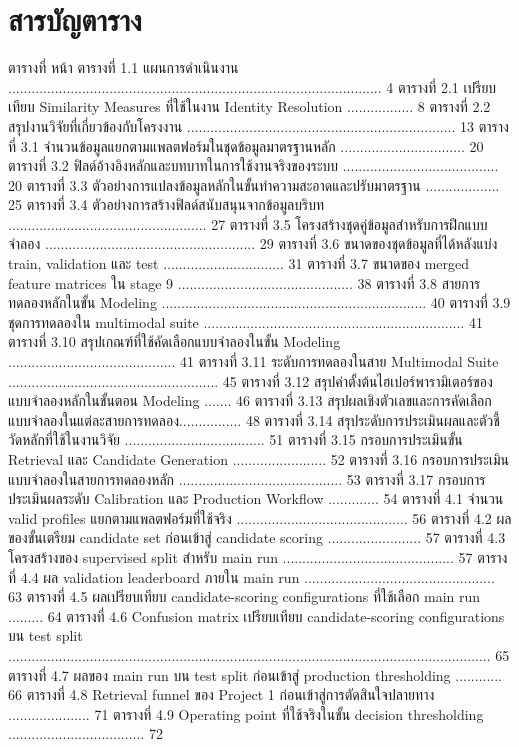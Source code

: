 \documentclass[12pt,a4paper]{report}
\begin{document}
\section*{สารบัญตาราง}
ตารางที่ หน้า ตารางที่ 1.1 แผนการดำเนินงาน ................................................................................................ 4 ตารางที่ 2.1 เปรียบเทียบ Similarity Measures ที่ใช้ในงาน Identity Resolution ................. 8 ตารางที่ 2.2 สรุปงานวิจัยที่เกี่ยวข้องกับโครงงาน ..................................................................... 13 ตารางที่ 3.1 จำนวนข้อมูลแยกตามแพลตฟอร์มในชุดข้อมูลมาตรฐานหลัก ................................ 20 ตารางที่ 3.2 ฟิลด์อ้างอิงหลักและบทบาทในการใช้งานจริงของระบบ ........................................ 20 ตารางที่ 3.3 ตัวอย่างการแปลงข้อมูลหลักในขั้นทำความสะอาดและปรับมาตรฐาน ................... 25 ตารางที่ 3.4 ตัวอย่างการสร้างฟิลด์สนับสนุนจากข้อมูลบริบท ................................................... 27 ตารางที่ 3.5 โครงสร้างชุดคู่ข้อมูลสำหรับการฝึกแบบจำลอง ...................................................... 29 ตารางที่ 3.6 ขนาดของชุดข้อมูลที่ได้หลังแบ่ง train, validation และ test ............................... 31 ตารางที่ 3.7 ขนาดของ merged feature matrices ใน stage 9 ............................................. 38 ตารางที่ 3.8 สายการทดลองหลักในขั้น Modeling .................................................................... 40 ตารางที่ 3.9 ชุดการทดลองใน multimodal suite ................................................................... 41 ตารางที่ 3.10 สรุปเกณฑ์ที่ใช้คัดเลือกแบบจำลองในขั้น Modeling ........................................... 41 ตารางที่ 3.11 ระดับการทดลองในสาย Multimodal Suite ...................................................... 45 ตารางที่ 3.12 สรุปค่าตั้งต้นไฮเปอร์พารามิเตอร์ของแบบจำลองหลักในขั้นตอน Modeling ....... 46 ตารางที่ 3.13 สรุปผลเชิงตัวเลขและการคัดเลือกแบบจำลองในแต่ละสายการทดลอง................ 48 ตารางที่ 3.14 สรุประดับการประเมินผลและตัวชี้วัดหลักที่ใช้ในงานวิจัย .................................... 51 ตารางที่ 3.15 กรอบการประเมินขั้น Retrieval และ Candidate Generation ........................ 52 ตารางที่ 3.16 กรอบการประเมินแบบจำลองในสายการทดลองหลัก .......................................... 53 ตารางที่ 3.17 กรอบการประเมินผลระดับ Calibration และ Production Workflow ............. 54 ตารางที่ 4.1 จำนวน valid profiles แยกตามแพลตฟอร์มที่ใช้จริง ............................................ 56 ตารางที่ 4.2 ผลของขั้นเตรียม candidate set ก่อนเข้าสู่ candidate scoring ........................ 57 ตารางที่ 4.3 โครงสร้างของ supervised split สำหรับ main run ............................................ 57 ตารางที่ 4.4 ผล validation leaderboard ภายใน main run ................................................. 63 ตารางที่ 4.5 ผลเปรียบเทียบ candidate-scoring configurations ที่ใช้เลือก main run ......... 64 ตารางที่ 4.6 Confusion matrix เปรียบเทียบ candidate-scoring configurations บน test split ............................................................................................................................ 65 ตารางที่ 4.7 ผลของ main run บน test split ก่อนเข้าสู่ production thresholding ............ 66 ตารางที่ 4.8 Retrieval funnel ของ Project 1 ก่อนเข้าสู่การตัดสินใจปลายทาง ..................... 71 ตารางที่ 4.9 Operating point ที่ใช้จริงในขั้น decision thresholding ................................... 72\par
\end{document}
